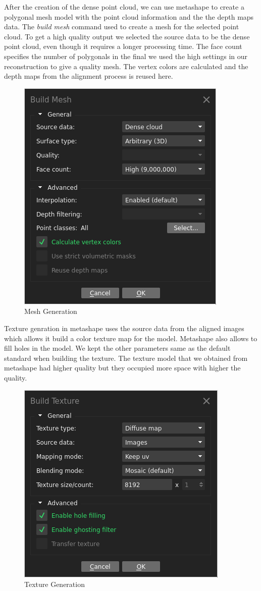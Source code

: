 After the creation of the dense point cloud, we can use metashape to create a polygonal mesh model with the point cloud information and the the depth maps data. The \emph{build mesh} command used to create a mesh for the selected point cloud. To get a high quality output we selected the source data to be the dense point cloud, even though it requires a longer processing time. The face count specifies the number of polygonals in the final we used the high settings in our reconstruction to give a quality mesh. The vertex colors are calculated and the depth maps from the alignment process is reused here.\\

\begin{figure}[H]
	\centering
	\includegraphics[scale=0.5]{img/mesh.png}
	\caption{Mesh Generation}
\end{figure}
Texture genration in metashape uses the source data from the aligned images which allows it build a color texture map for the model. Metashape also allows to fill holes in the model. We kept the other parameters same as the default standard when building the texture. The texture model that we obtained from metashape had higher quality but they occupied more space with higher the quality.

\begin{figure}[H]
	\centering
	\includegraphics[scale=0.5]{img/texture.png}
	\caption{Texture Generation}
\end{figure}

